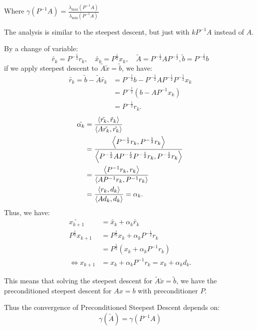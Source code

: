 \documentclass[../main/main.tex]{subfiles}
\begin{document}
         Where $\gamma(P^{-1}A) = \frac{\lambda_{\max}(P^{-1}A)}{\lambda_{\min}(P^{-1}A)} $
\begin{remark}
The analysis is similar to the steepest descent, but just with $kP^{-1} A$ instead of $A$.
\end{remark}
By a change of variable: \[
  \tilde{r_{k}} = P^{-\frac{1}{2}} r_{k}, \quad \tilde{x_{k}}=P^{\frac{1}{2}}x_{k}, \quad \tilde{A} = P^{-\frac{1}{2}}AP^{- \frac{1}{2}}, \tilde{b} = P^{ - \frac{1}{2} } b
\] if we apply steepest descent to $\tilde{A}\tilde{x}= \tilde{b}$, we have: \begin{align*}
                                                                               \tilde{r_{k}}= \tilde{b}-\tilde{A}\tilde{r_{k}}&= P^{-\frac{1}{2}} b-P^{- \frac{1}{2}}A P^{- \frac{1}{2}}P^{- \frac{1}{2}}x_{k}\\
                        &=P^{ - \frac{1}{2} } (b-AP^{-1}x_{k})\\
                                                                               &=P^{-\frac{1}{2}}r_{k}
                                                                               .\end{align*}
 \begin{align*}
   \tilde{\alpha_{k}}&= \frac{\left\langle{\tilde{r_{k}}},{\tilde{r}_{k}}\right\rangle}{\left\langle{A\tilde{r_{k}}},{\tilde{r_{k}}}\right\rangle}\\
   &=\frac{\left\langle{P^{-\frac{1}{2}}r_{k}},{P^{ - \frac{1}{2} }r_{k}}\right\rangle}{\left\langle{P^{ - \frac{1}{2} }A P^{-\frac{1}{2}}P^{-\frac{1}{2}}r_{k}},{P^{-\frac{1}{2}}r_{k}}\right\rangle}\\
   &=\frac{\left\langle{P^{-1}r_{k}},{r_{k}}\right\rangle}{\left\langle{AP^{-1}r_{k}},{P^{-1}r_{k}}\right\rangle}\\
   &= \frac{\left\langle{r_{k}},{d_{k}}\right\rangle}{\left\langle{Ad_{k}},{d_{k}}\right\rangle}  = \alpha_{k}
   .\end{align*}
 Thus, we have:
 \begin{align*}
   \tilde{x_{k+1}}&= \tilde{x_{k}}+\alpha_{k}\tilde{r_{k}}\\
   P^{\frac{1}{2}}x_{k+1} &= P^{\frac{1}{2}}x_{k}+\alpha_{k}P^{-\frac{1}{2}}r_{k}\\
   &=P^{\frac{1}{2}}(x_{k}+\alpha_{k}P^{-1}r_{k})\\
   \iff x_{k+1}&=  x_{k}+\alpha_{k}P^{-1}r_{k} = x_{k}+\alpha_{k}d_{k}
   .\end{align*}
 \begin{remark}
   This means that solving the steepest descent for $\tilde{A}\tilde{x}=\tilde{b}$, we have the preconditioned steepest descent for $Ax=b$ with preconditioner $P$.
 \end{remark}
 Thus the convergence of Preconditioned Steepest Descent depends on: \[
   \gamma(\tilde{A}) = \gamma(P^{-1} A)
 \]
\end{document}
